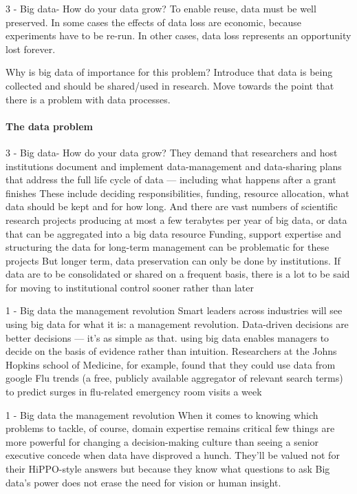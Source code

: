 3 - Big data- How do your data grow?
To enable reuse, data must be well preserved. In some cases the effects of data loss are economic, because experiments have to be re-run. In other cases, data loss represents an opportunity lost forever.

Why is big data of importance for this problem?
Introduce that data is being collected and should be shared/used in research.
Move towards the point that there is a problem with data processes.

\paragraph{The data problem}
3 - Big data- How do your data grow?
They demand that researchers and host institutions document and implement data-management and data-sharing plans that address the full life cycle of data — including what happens after a grant finishes
These include deciding responsibilities, funding, resource allocation, what data should be kept and for how long.
And there are vast numbers of scientific research projects producing at most a few terabytes per year of big data, or data that can be aggregated into a big data resource
Funding, support expertise and structuring the data for long-term management can be problematic for these projects
But longer term, data preservation can only be done by institutions. If data are to be consolidated or shared on a frequent basis, there is a lot to be said for moving to institutional control sooner rather than later

1 - Big data the management revolution
Smart leaders across industries will see using big data for what it is: a management revolution.
Data-driven decisions are better decisions — it's as simple as that. using big data enables managers to decide on the basis of evidence rather than intuition.
Researchers at the Johns Hopkins school of Medicine, for example, found that they could use data from google Flu trends (a free, publicly available aggregator of relevant search terms) to predict surges in flu-related emergency room visits a week

1 - Big data the management revolution
When it comes to knowing which problems to tackle, of course, domain expertise remains critical
few things are more powerful for changing a decision-making culture than seeing a senior executive concede when data have disproved a hunch.
They'll be valued not for their HiPPO-style answers but because they know what questions to ask
Big data's power does not erase the need for vision or human insight.

